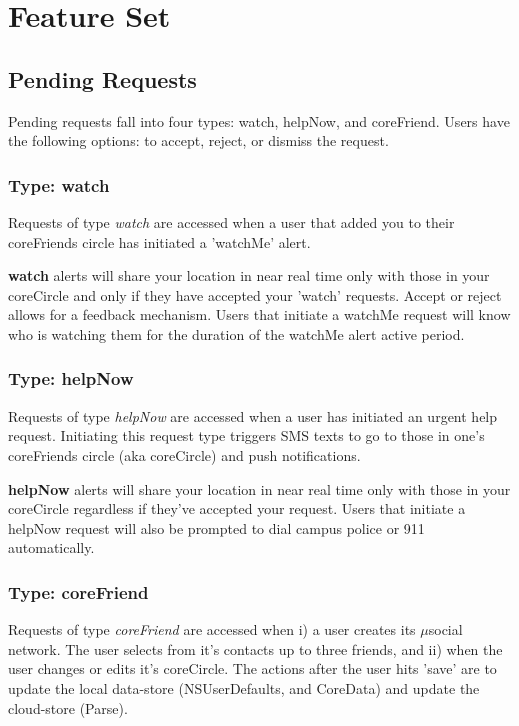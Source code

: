 \section{Feature Set}

\subsection{Pending Requests}
  Pending requests fall into four types: watch, helpNow, and coreFriend.
  Users have the following options: to accept, reject, or dismiss the request.
    
\subsubsection{Type: watch}
  Requests of type \emph{watch} are accessed when a user that added you to their 
  coreFriends circle has initiated a 'watchMe' alert.
  
  \textbf{watch} alerts will share your location in near real time only with those
  in your coreCircle and only if they have accepted your 'watch' requests.  Accept or 
  reject allows for a feedback mechanism.  Users that initiate a watchMe request will
  know who is watching them for the duration of the watchMe alert active period.
  
\subsubsection{Type: helpNow}
  Requests of type \emph{helpNow} are accessed when a user has initiated an urgent help
  request.  Initiating this request type triggers SMS texts to go to those in
  one's coreFriends circle (aka coreCircle) and push notifications.
  
  \textbf{helpNow} alerts will share your location in near real time only with those
  in your coreCircle regardless if they've accepted your request.  Users that initiate 
  a helpNow request will also be prompted to dial campus police or 911 automatically.
   
\subsubsection{Type: coreFriend }
  Requests of type \emph{coreFriend} are accessed when i) a user creates its $\mu$social
  network.  The user selects from it's contacts up to three friends, and ii) when the user
  changes or edits it's coreCircle.  The actions after the user hits 'save' are to update
  the local data-store (NSUserDefaults, and CoreData) and update the cloud-store (Parse).
  
